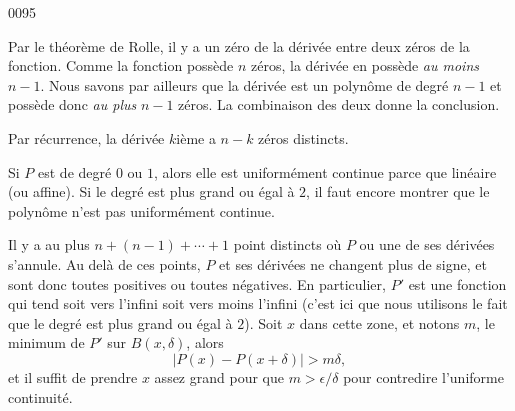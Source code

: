 
\begin{corrige}{0095}

Par le théorème de Rolle, il y a un zéro de la dérivée entre deux zéros de la fonction. Comme la fonction possède $n$ zéros, la dérivée en possède \emph{au moins} $n-1$. Nous savons par ailleurs que la dérivée est un polynôme de degré $n-1$ et possède donc \emph{au plus} $n-1$ zéros. La combinaison des deux donne la conclusion.

Par récurrence, la dérivée $k$ième a $n-k$ zéros distincts.

Si $P$ est de degré $0$ ou $1$, alors elle est uniformément continue parce que linéaire (ou affine). Si le degré est plus grand ou égal à $2$, il faut encore montrer que le polynôme n'est pas uniformément continue.

Il y a au plus $n+(n-1)+\cdots+1$ point distincts où $P$ ou une de ses dérivées s'annule. Au delà de ces points, $P$ et ses dérivées ne changent plus de signe, et sont donc toutes positives ou toutes négatives. En particulier, $P'$ est une fonction qui tend soit vers l'infini soit vers moins l'infini (c'est ici que nous utilisons le fait que le degré est plus grand ou égal à $2$). Soit $x$ dans cette zone, et notons $m$, le minimum de $P'$ sur $B(x,\delta)$, alors
\begin{equation}
	| P(x)-P(x+\delta) |>m\delta,
\end{equation}
et il suffit de prendre $x$ assez grand pour que $m>\epsilon/\delta$ pour contredire l'uniforme continuité.

\end{corrige}
